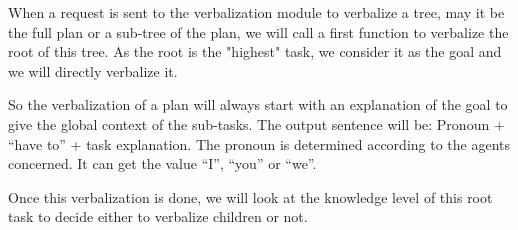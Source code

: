 \documentclass{llncs}
\begin{document}
When a request is sent to the verbalization module to verbalize a tree, may it be the full plan or a sub-tree of the plan, we will call a first function to verbalize the root of this tree. As the root is the "highest" task, we consider it as the goal and we will directly verbalize it.

So the verbalization of a plan will always start with an explanation of the goal to give the global context of the sub-tasks.
The output sentence will be:
Pronoun + ``have to'' + task explanation.
The pronoun is determined according to the agents concerned. It can get the value ``I'', ``you'' or ``we''.

Once this verbalization is done, we will look at the knowledge level of this root task to decide either to verbalize children or not.




\end{document}

